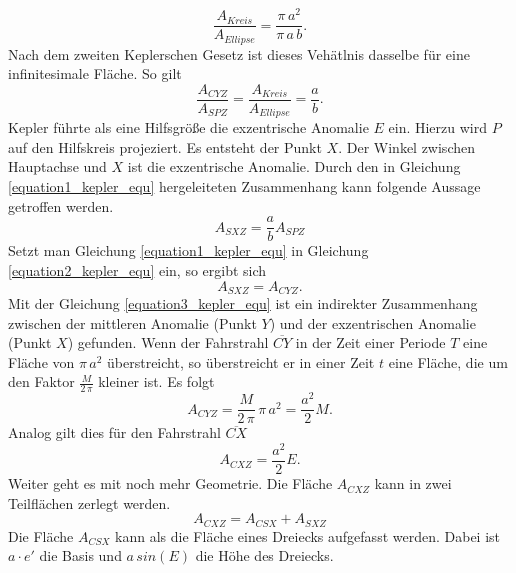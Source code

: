 \begin{equation}
	\frac{A_{Kreis}}{A_{Ellipse}}=\frac{\pi\,a^2}{\pi\,a\,b}.
\end{equation}
Nach dem zweiten Keplerschen Gesetz ist dieses Vehätlnis dasselbe für eine infinitesimale Fläche. So gilt
\begin{equation}
	\frac{A_{CYZ}}{A_{SPZ}}=\frac{A_{Kreis}}{A_{Ellipse}}=\frac{a}{b}.
	\label{equation1_kepler_equ}
\end{equation}
\newpar
Kepler führte als eine Hilfsgröße die exzentrische Anomalie \ensuremath{E} ein. Hierzu wird \ensuremath{P} auf den Hilfskreis projeziert. Es entsteht der Punkt \ensuremath{X}. Der Winkel zwischen Hauptachse und \ensuremath{X} ist die exzentrische Anomalie. Durch den in Gleichung \ref{equation1_kepler_equ} hergeleiteten Zusammenhang kann folgende Aussage getroffen werden. 
\begin{equation}
	A_{SXZ}=\frac{a}{b}A_{SPZ}	
	\label{equation2_kepler_equ}
\end{equation}  
Setzt man Gleichung \ref{equation1_kepler_equ} in Gleichung \ref{equation2_kepler_equ} ein, so ergibt sich
\begin{equation}
	A_{SXZ}=A_{CYZ}.
	\label{equation3_kepler_equ}
\end{equation}
Mit der Gleichung \ref{equation3_kepler_equ} ist ein indirekter Zusammenhang zwischen der mittleren Anomalie (Punkt \ensuremath{Y}) und der exzentrischen Anomalie (Punkt \ensuremath{X}) gefunden. Wenn der Fahrstrahl \ensuremath{\overline{CY}} in der Zeit einer Periode \ensuremath{T} eine Fläche von \ensuremath{\pi\,a^2} überstreicht, so überstreicht er in einer Zeit \ensuremath{t} eine Fläche, die um den Faktor \ensuremath{\frac{M}{2\,\pi}} kleiner ist. Es folgt 
\begin{equation}
	A_{CYZ}=\frac{M}{2\,\pi}\,\pi\,a^2=\frac{a^2}{2}M.
	\label{equation4_kepler_equ}
\end{equation}  
Analog gilt dies für den Fahrstrahl \ensuremath{\overline{CX}}
\begin{equation}
	A_{CXZ}=\frac{a^2}{2}E.
	\label{equation5_kepler_equ}
\end{equation}
Weiter geht es mit noch mehr Geometrie. Die Fläche \ensuremath{A_{CXZ}} kann in zwei Teilflächen zerlegt werden.
\begin{equation}
	A_{CXZ}=A_{CSX}+A_{SXZ}
	\label{equation6_kepler_equ}
\end{equation}
Die Fläche \ensuremath{A_{CSX}} kann als die Fläche eines Dreiecks aufgefasst werden. Dabei ist \ensuremath{a\cdot e'} die Basis und \ensuremath{a\,sin(E)} die Höhe des Dreiecks. 
